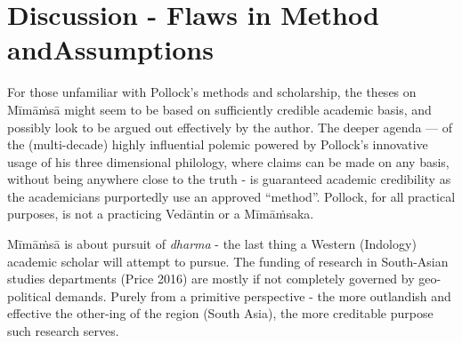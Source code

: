 \section*{Discussion - Flaws in Method and\hfill \break Assumptions}

For those unfamiliar with Pollock’s methods and scholarship, the theses on Mīmāṁsā might seem to be based on sufficiently credible academic basis, and possibly look to be argued out effectively by the author. The deeper agenda — of the (multi-decade) highly influential polemic powered by Pollock’s innovative usage of his three dimensional philology, where claims can be made on any basis, without being anywhere close to the truth - is guaranteed academic credibility as the academicians purportedly use an approved “method”. Pollock, for all practical purposes, is not a practicing Vedāntin or a Mīmāṁsaka.

Mīmāṁsā is about pursuit of \textit{dharma} - the last thing a Western (Indology) academic scholar will attempt to pursue. The funding of research in South-Asian studies departments (Price 2016) are mostly if not completely governed by geo-political demands. Purely from a primitive perspective - the more outlandish and effective the other-ing of the region (South Asia), the more creditable purpose such research serves.

